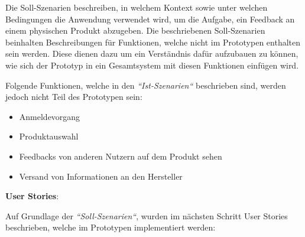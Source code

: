 Die Soll-Szenarien beschreiben, in welchem Kontext sowie unter welchen Bedingungen die Anwendung verwendet wird, um die Aufgabe, ein Feedback an einem physischen Produkt abzugeben. 
Die beschriebenen Soll-Szenarien beinhalten Beschreibungen für Funktionen, welche nicht im Prototypen enthalten sein werden. Diese dienen dazu um ein Verständnis dafür aufzubauen zu können, wie sich der Prototyp in ein Gesamtsystem mit diesen Funktionen einfügen wird. 

Folgende Funktionen, welche in den \textit{``Ist-Szenarien``} beschrieben sind, werden jedoch nicht Teil des Prototypen sein: 

\begin{itemize}
\item{Anmeldevorgang} 
\item{Produktauswahl} 
\item{Feedbacks von anderen Nutzern auf dem Produkt sehen}
\item{Versand von Informationen an den Hersteller}
\end{itemize}


\textbf{User Stories}:

Auf Grundlage der \textit{``Soll-Szenarien``}, wurden im nächsten Schritt User Stories beschrieben, welche im Prototypen implementiert werden: 

